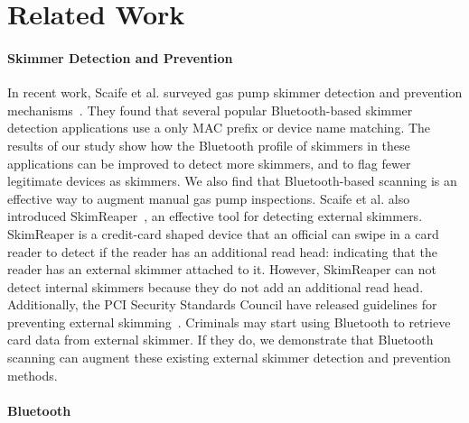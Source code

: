 \section{Related Work}
\label{sec:relatedwork}
\paragraph{Skimmer Detection and Prevention}

In recent work, Scaife et al. surveyed gas pump skimmer detection and
prevention mechanisms~\cite{scaifeoakland}.
%
They found that several popular Bluetooth-based skimmer detection applications
use a only MAC prefix or device name matching.
%
The results of our study show how the Bluetooth profile of skimmers in these
applications can be improved to detect more skimmers, and to flag fewer
legitimate devices as skimmers.
%
We also find that Bluetooth-based scanning is an effective way to augment
manual gas pump inspections.
%
Scaife et al. also introduced SkimReaper~\cite{skimreaper2018}, an effective
tool for detecting external skimmers.
%
SkimReaper is a credit-card shaped device that an official can swipe in a card
reader to detect if the reader has an additional read head: indicating that the
reader has an external skimmer attached to it.
%
%
%
However, SkimReaper can not detect internal skimmers because they do not
add an additional read head.
%
Additionally, the PCI Security Standards Council have released guidelines for
preventing external skimming~\cite{skimmingprevention}.
%
Criminals may start using Bluetooth to retrieve card data
from external skimmer. If they do, we
demonstrate that Bluetooth scanning can augment
these existing external skimmer detection and prevention methods.
%
%
%

\paragraph{Bluetooth}

